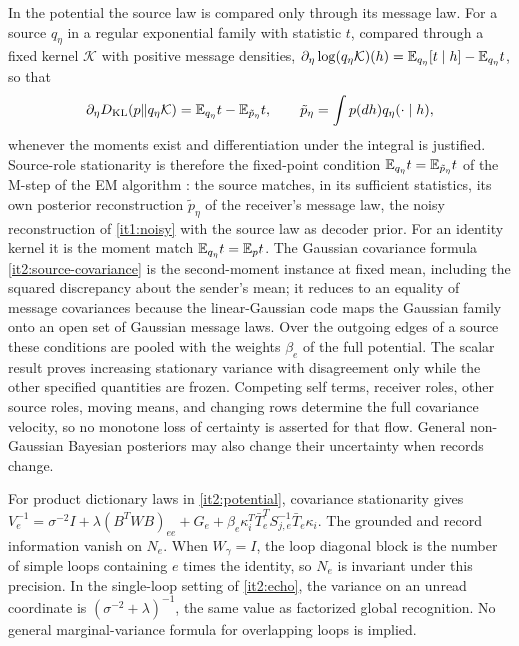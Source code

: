 In the potential the source law is compared only through its message law. For a source $q_\eta$ in a regular exponential family with statistic $t$, compared through a fixed kernel $\mathcal K$ with positive message densities, $\partial_\eta\log(q_\eta\mathcal K)(h)=\mathbb E_{q_\eta}[t\mid h]-\mathbb E_{q_\eta}t$, so that
\begin{equation}
\partial_\eta D_{\mathrm{KL}}(p\Vert q_\eta\mathcal K)=\mathbb E_{q_\eta}t-\mathbb E_{\tilde p_\eta}t,\qquad
\tilde p_\eta=\int p(dh)q_\eta(\cdot\mid h),
\label{it2:em-stationarity}
\end{equation}
whenever the moments exist and differentiation under the integral is justified. Source-role stationarity is therefore the fixed-point condition $\mathbb E_{q_\eta}t=\mathbb E_{\tilde p_\eta}t$ of the M-step of the EM algorithm \citep{DempsterLairdRubin1977}: the source matches, in its sufficient statistics, its own posterior reconstruction $\tilde p_\eta$ of the receiver's message law, the noisy reconstruction of \cref{it1:noisy} with the source law as decoder prior. For an identity kernel it is the moment match $\mathbb E_{q_\eta}t=\mathbb E_pt$. The Gaussian covariance formula \cref{it2:source-covariance} is the second-moment instance at fixed mean, including the squared discrepancy about the sender's mean; it reduces to an equality of message covariances because the linear-Gaussian code maps the Gaussian family onto an open set of Gaussian message laws. Over the outgoing edges of a source these conditions are pooled with the weights $\beta_e$ of the full potential. The scalar result proves increasing stationary variance with disagreement only while the other specified quantities are frozen. Competing self terms, receiver roles, other source roles, moving means, and changing rows determine the full covariance velocity, so no monotone loss of certainty is asserted for that flow. General non-Gaussian Bayesian posteriors may also change their uncertainty when records change.

For product dictionary laws in \cref{it2:potential}, covariance stationarity gives $V_e^{-1}=\sigma^{-2}I+\lambda(B^TWB)_{ee}+G_e+\beta_e\kappa_i^T\bar T_e^TS_{j,e}^{-1}\bar T_e\kappa_i$. The grounded and record information vanish on $N_e$. When $W_\gamma=I$, the loop diagonal block is the number of simple loops containing $e$ times the identity, so $N_e$ is invariant under this precision. In the single-loop setting of \cref{it2:echo}, the variance on an unread coordinate is $(\sigma^{-2}+\lambda)^{-1}$, the same value as factorized global recognition. No general marginal-variance formula for overlapping loops is implied.


